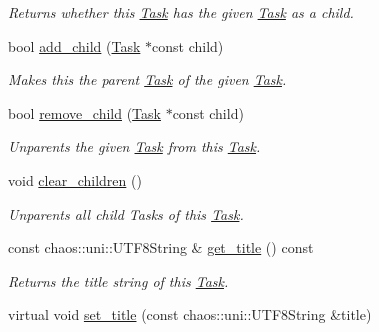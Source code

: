 \begin{DoxyCompactItemize}
\begin{DoxyCompactList}\small\item\em Returns whether this \hyperlink{classsigma_1_1core_1_1tasks_1_1_task}{Task} has the given \hyperlink{classsigma_1_1core_1_1tasks_1_1_task}{Task} as a child. \end{DoxyCompactList}\item 
bool \hyperlink{classsigma_1_1core_1_1tasks_1_1_task_abac88c4ddaf54ae20aab497e95023f9e}{add\-\_\-child} (\hyperlink{classsigma_1_1core_1_1tasks_1_1_task}{Task} $\ast$const child)
\begin{DoxyCompactList}\small\item\em Makes this the parent \hyperlink{classsigma_1_1core_1_1tasks_1_1_task}{Task} of the given \hyperlink{classsigma_1_1core_1_1tasks_1_1_task}{Task}. \end{DoxyCompactList}\item 
bool \hyperlink{classsigma_1_1core_1_1tasks_1_1_task_a9df7e8a262b51b440cc6a45dbe219810}{remove\-\_\-child} (\hyperlink{classsigma_1_1core_1_1tasks_1_1_task}{Task} $\ast$const child)
\begin{DoxyCompactList}\small\item\em Unparents the given \hyperlink{classsigma_1_1core_1_1tasks_1_1_task}{Task} from this \hyperlink{classsigma_1_1core_1_1tasks_1_1_task}{Task}. \end{DoxyCompactList}\item 
void \hyperlink{classsigma_1_1core_1_1tasks_1_1_task_acb08acc571c5e0678d27d52a18a7db5e}{clear\-\_\-children} ()
\begin{DoxyCompactList}\small\item\em Unparents all child Tasks of this \hyperlink{classsigma_1_1core_1_1tasks_1_1_task}{Task}. \end{DoxyCompactList}\item 
\hypertarget{classsigma_1_1core_1_1tasks_1_1_task_a8fd41c73909654ee57670b45c273a65b}{const chaos\-::uni\-::\-U\-T\-F8\-String \& \hyperlink{classsigma_1_1core_1_1tasks_1_1_task_a8fd41c73909654ee57670b45c273a65b}{get\-\_\-title} () const }\label{classsigma_1_1core_1_1tasks_1_1_task_a8fd41c73909654ee57670b45c273a65b}

\begin{DoxyCompactList}\small\item\em Returns the title string of this \hyperlink{classsigma_1_1core_1_1tasks_1_1_task}{Task}. \end{DoxyCompactList}\item 
\hypertarget{classsigma_1_1core_1_1tasks_1_1_task_ab65a709ed6a7e804fea2b0ef763313c9}{virtual void \hyperlink{classsigma_1_1core_1_1tasks_1_1_task_ab65a709ed6a7e804fea2b0ef763313c9}{set\-\_\-title} (const chaos\-::uni\-::\-U\-T\-F8\-String \&title)}\label{classsigma_1_1core_1_1tasks_1_1_task_ab65a709ed6a7e804fea2b0ef763313c9}


\end{DoxyCompactItemize}
